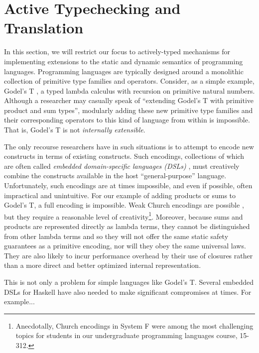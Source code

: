 \section{Active Typechecking and Translation}\label{att}

In this section, we will restrict our focus to actively-typed mechanisms for implementing extensions to the static and dynamic semantics of programming languages. Programming languages are typically designed around a monolithic collection of primitive type families and operators. Consider, as a simple example, Godel's T \cite{pfpl}, a typed lambda calculus with recursion on primitive natural numbers. Although a researcher may casually speak of ``extending Godel's T with primitive product and sum types'', modularly adding these new primitive type families and their corresponding operators to this kind of language from within is impossible. That is, Godel's T is not \emph{internally extensible}.

The only recourse researchers have in such situations is to attempt to encode new constructs in terms of existing constructs. Such encodings, collections of which are often called \emph{embedded domain-specific languages (DSLs)} \cite{fowler2010domain}, must creatively combine the constructs available in the host ``general-purpose'' language. Unfortunately, such encodings are at times impossible, and even if possible, often impractical and unintuitive. For our example of adding products or sums to Godel's T, a full encoding is impossible. Weak Church encodings are possible \cite{pfpl}, but they require a reasonable level of creativity\footnote{Anecdotally, Church encodings in System F were among the most challenging topics for students in our undergraduate programming languages course, 15-312.}. Moreover, because sums and products are represented directly as lambda terms, they cannot be distinguished from other lambda terms and so they will not offer the same static safety guarantees as a primitive encoding, nor will they obey the same universal laws. They are also likely to incur performance overhead by their use of closures rather than a more direct and better optimized internal representation. 

This is not only a problem for simple languages like Godel's T. Several embedded DSLs for Haskell have also needed to make significant compromises at times. For example...  

